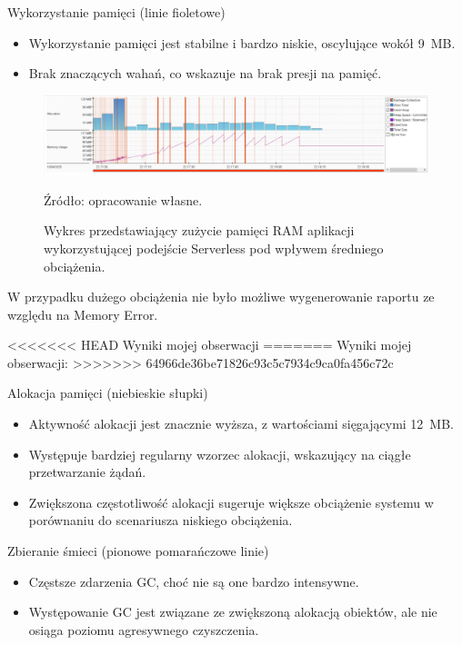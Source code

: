 \documentclass[runningheads,12pt]{llncs}
\begin{document}
Wykorzystanie pamięci (linie fioletowe)

\begin{itemize}
    \item Wykorzystanie pamięci jest stabilne i bardzo niskie, oscylujące wokół 9~MB.
    \item Brak znaczących wahań, co wskazuje na brak presji na pamięć.
\end{itemize}

\newpage

\begin{figure}
    \includegraphics[width=\linewidth]{images/serverless-memory-middle-graph.jpg}
    \caption{Wykres przedstawiający zużycie pamięci RAM aplikacji wykorzystującej podejście Serverless pod wpływem średniego obciążenia.} \label{fig1}
    \vspace{0.5em}
    {\small Źródło: opracowanie własne.}
\end{figure}

W przypadku dużego obciążenia nie było możliwe wygenerowanie raportu ze względu na Memory Error.

<<<<<<< HEAD
Wyniki mojej obserwacji
=======
Wyniki mojej obserwacji:
>>>>>>> 64966de36be71826c93c5c7934c9ca0fa456c72c

Alokacja pamięci (niebieskie słupki)

\begin{itemize}
    \item Aktywność alokacji jest znacznie wyższa, z wartościami sięgającymi 12~MB.
    \item Występuje bardziej regularny wzorzec alokacji, wskazujący na ciągłe przetwarzanie żądań.
    \item Zwiększona częstotliwość alokacji sugeruje większe obciążenie systemu w porównaniu do scenariusza niskiego obciążenia.
\end{itemize}

Zbieranie śmieci (pionowe pomarańczowe linie)

\begin{itemize}
    \item Częstsze zdarzenia GC, choć nie są one bardzo intensywne.
    \item Występowanie GC jest związane ze zwiększoną alokacją obiektów, ale nie osiąga poziomu agresywnego czyszczenia.
\end{itemize}
\end{document}

